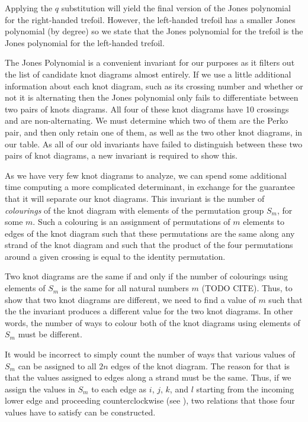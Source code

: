 \begin{paper}
Applying the $q$ substitution will yield the final version of the Jones
polynomial for the right-handed trefoil.
However, the left-handed trefoil has a smaller Jones polynomial (by degree) so
we state that the Jones polynomial for the trefoil is the Jones polynomial for
the left-handed trefoil.




The Jones Polynomial is a convenient invariant for our purposes as it filters
out the list of candidate knot diagrams almost entirely.
If we use a little additional information about each knot diagram, such as its
crossing number and whether or not it is alternating then the Jones polynomial
only fails to differentiate between two pairs of knots diagrams.
All four of these knot diagrams have 10 crossings and are non-alternating.
We must determine which two of them are the Perko pair, and then only retain one
of them, as well as the two other knot diagrams, in our table.
As all of our old invariants have failed to distinguish between these two pairs
of knot diagrams, a new invariant is required to show this.

As we have very few knot diagrams to analyze, we can spend some additional time
computing a more complicated determinant, in exchange for the guarantee that it
will separate our knot diagrams.
This invariant is the number of \textit{colourings} of the knot diagram with
elements of the permutation group $S_m$, for some $m$.
Such a colouring is an assignment of permutations of $m$ elements to edges of
the knot diagram such that these permutations are the same along any strand of
the knot diagram and such that the product of the four permutations around a
given crossing is equal to the identity permutation.

Two knot diagrams are the same if and only if the number of colourings using
elements of $S_m$ is the same for all natural numbers $m$ (TODO CITE).
Thus, to show that two knot diagrams are different, we need to find a value of
$m$ such that the the invariant produces a different value for the two knot
diagrams.
In other words, the number of ways to colour both of the knot diagrams using
elements of $S_m$ must be different.

It would be incorrect to simply count the number of ways that various values of
$S_m$ can be assigned to all $2n$ edges of the knot diagram.
The reason for that is that the values assigned to edges along a strand must be
the same.
Thus, if we assign the values in $S_m$ to each edge as $i$, $j$, $k$, and $l$
starting from the incoming lower edge and proceeding counterclockwise (see
\figX), two relations that those four values have to satisfy can be constructed.


\end{paper}
